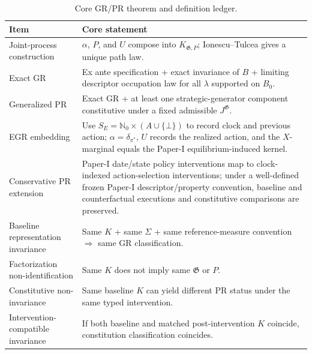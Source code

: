 \documentclass[10pt]{article}
\begin{document}
\begin{table}[htbp]
\centering
\footnotesize
\caption{Core GR/PR theorem and definition ledger.}
\label{tab:core-ledger}
\begin{tabularx}{\textwidth}{@{}>{\raggedright\arraybackslash}p{}X@{}}
\toprule
\textbf{Item} & \textbf{Core statement}\\
\midrule
Joint-process construction & $\alpha$, $P$, and $U$ compose into $K_{\mathfrak G,P}$; Ionescu--Tulcea gives a unique path law.\\
Exact GR & Ex ante specification + exact invariance of $B$ + limiting descriptor occupation law for all $\lambda$ supported on $B_0$.\\
Generalized PR & Exact GR + at least one strategic-generator component constitutive under a fixed admissible $J^{\mathfrak G}$.\\
EGR embedding & Use $S_E=\mathbb N_0\times(A\cup\{\bot\})$ to record clock and previous action; $\alpha=\delta_{\pi^\ast}$, $U$ records the realized action, and the $X$-marginal equals the Paper-I equilibrium-induced kernel.\\
Conservative PR extension & Paper-I date/state policy interventions map to clock-indexed action-selection interventions; under a well-defined frozen Paper-I descriptor/property convention, baseline and counterfactual executions and constitutive comparisons are preserved.\\
Baseline representation invariance & Same $K$ + same $\Sigma$ + same reference-measure convention $\Rightarrow$ same GR classification.\\
Factorization non-identification & Same $K$ does not imply same $\mathfrak G$ or $P$.\\
Constitutive non-invariance & Same baseline $K$ can yield different PR status under the same typed intervention.\\
Intervention-compatible invariance & If both baseline and matched post-intervention $K$ coincide, constitution classification coincides.\\
\bottomrule
\end{tabularx}
\end{table}
\end{document}
